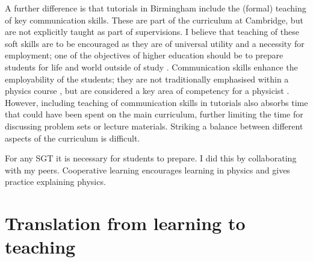A further difference is that tutorials in Birmingham include the (formal) teaching of key communication skills. These are part of the curriculum at Cambridge, but are not explicitly taught as part of supervisions. %
I believe that teaching of these soft skills are to be encouraged as they are of universal utility and a necessity for employment; one of the objectives of higher education should be to prepare students for life and world outside of study \citep{Fallows2000,Harvey2000}. Communication skills enhance the employability of the students; they are not traditionally emphasised within a physics course \citep[cf.][]{Sharma2007}, but are considered a key area of competency for a physicist \citep{Gonsalves2014a}. However, including teaching of communication skills in tutorials also absorbs time that could have been spent on the main curriculum, further limiting the time for discussing problem sets or lecture materials. Striking a balance between different aspects of the curriculum is difficult.

For any SGT it is necessary for students to prepare. I did this by collaborating with my peers. Cooperative learning encourages learning in physics \citep{Springer1999,Crouch2001,Pilzer2001,Miller2006} and gives practice explaining physics.


 

\section{Translation from learning to teaching}


